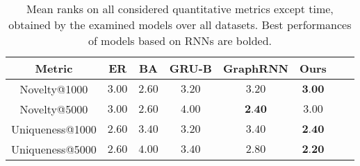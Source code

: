 \begin{table}[h!]
    \footnotesize
    \centering
    \caption{Mean ranks on all considered quantitative metrics except time, obtained by the examined models over all datasets. Best performances of models based on RNNs are bolded.}
    \label{tab:graph-quantitative-rank}
    \renewcommand{\arraystretch}{1.2}
    \begin{tabular}{cccccccc}
          \toprule
          \textbf{Metric} & \textbf{ER} & \textbf{BA} & \textbf{GRU-B} & \textbf{GraphRNN} & \textbf{Ours} \\
          \midrule
          Novelty@1000    & $3.00$ & $2.60$ & $3.20$ & $3.20$          & $\textbf{3.00}$\\
          Novelty@5000    & $3.00$ & $2.60$          & $4.00$ & $\textbf{2.40}$ & $3.00$\\
          Uniqueness@1000 & $2.60$ & $3.40$          & $3.20$ & $3.40$          & $\textbf{2.40}$\\
          Uniqueness@5000 & $2.60$ & $4.00$          & $3.40$ & $2.80$          & $\textbf{2.20}$\\
          \bottomrule
    \end{tabular}
\end{table}